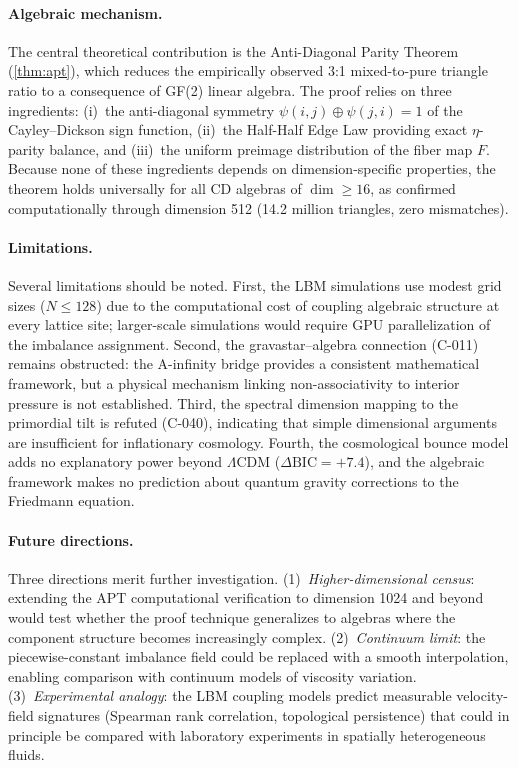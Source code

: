 \documentclass[12pt,openany]{report}
\theoremstyle{definition}
\theoremstyle{plain}
\theoremstyle{remark}
\begin{document}
\paragraph{Algebraic mechanism.}
The central theoretical contribution is the Anti-Diagonal Parity
Theorem (\cref{thm:apt}), which reduces the empirically observed 3:1
mixed-to-pure triangle ratio to a consequence of GF(2) linear algebra.
The proof relies on three ingredients: (i)~the anti-diagonal symmetry
$\psi(i,j) \oplus \psi(j,i) = 1$ of the Cayley--Dickson sign function,
(ii)~the Half-Half Edge Law providing exact $\eta$-parity balance,
and (iii)~the uniform preimage distribution of the fiber map $F$.
Because none of these ingredients depends on dimension-specific
properties, the theorem holds universally for all CD algebras of
$\dim \geq 16$, as confirmed computationally through dimension 512
(14.2 million triangles, zero mismatches).

\paragraph{Limitations.}
Several limitations should be noted.  First, the LBM simulations use
modest grid sizes ($N \leq 128$) due to the computational cost of
coupling algebraic structure at every lattice site; larger-scale
simulations would require GPU parallelization of the imbalance
assignment.  Second, the gravastar--algebra connection (C-011) remains
obstructed: the A-infinity bridge provides a consistent mathematical
framework, but a physical mechanism linking non-associativity to
interior pressure is not established.  Third, the spectral dimension
mapping to the primordial tilt is refuted (C-040), indicating that
simple dimensional arguments are insufficient for inflationary
cosmology.  Fourth, the cosmological bounce model adds no explanatory
power beyond $\Lambda$CDM ($\Delta\mathrm{BIC} = +7.4$), and the
algebraic framework makes no prediction about quantum gravity
corrections to the Friedmann equation.

\paragraph{Future directions.}
Three directions merit further investigation.  (1)~\emph{Higher-dimensional
census}: extending the APT computational verification to dimension 1024
and beyond would test whether the proof technique generalizes to
algebras where the component structure becomes increasingly complex.
(2)~\emph{Continuum limit}: the piecewise-constant imbalance field
could be replaced with a smooth interpolation, enabling comparison with
continuum models of viscosity variation.  (3)~\emph{Experimental analogy}:
the LBM coupling models predict measurable velocity-field signatures
(Spearman rank correlation, topological persistence) that could in
principle be compared with laboratory experiments in spatially
heterogeneous fluids.
\end{document}

